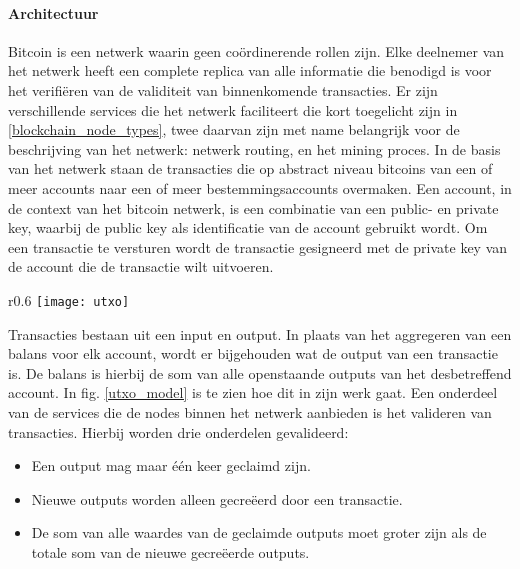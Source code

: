 \paragraph{Architectuur}
Bitcoin is een netwerk waarin geen coördinerende rollen zijn. Elke deelnemer van het netwerk heeft een complete replica van alle informatie die benodigd is voor het verifiëren van de validiteit van binnenkomende transacties. Er zijn verschillende services die het netwerk faciliteert die kort toegelicht zijn in \ref{blockchain_node_types}, twee daarvan zijn met name belangrijk voor de beschrijving van het netwerk: netwerk routing, en het mining proces. In de basis van het netwerk staan de transacties die op abstract niveau bitcoins van een of meer accounts naar een of meer bestemmingsaccounts overmaken. Een \gls{account}, in de context van het bitcoin netwerk, is een combinatie van een public- en private key, waarbij de public key als identificatie van de \gls{account} gebruikt wordt. Om een transactie te versturen wordt de transactie gesigneerd met de private key van de \gls{account} die de transactie wilt uitvoeren. 
\begin{wrapfigure}{r}{0.6\textwidth}
  \texttt{[image: utxo]}
  \caption[UTXO-model]{Voorbeeld van het UTXO-model zoals in gebruik bij Bitcoin, bron: http://news.8btc.com/thoughts-on-bytom-design-extension-of-utxo-structure.}
  \label{utxo_model}
\end{wrapfigure}

Transacties bestaan uit een input en output. In plaats van het aggregeren van een balans voor elk \gls{account}, wordt er bijgehouden wat de output van een transactie is. De balans is hierbij de som van alle openstaande outputs van het desbetreffend \gls{account}. In fig. \ref{utxo_model} is te zien hoe dit in zijn werk gaat. Een onderdeel van de services die de \glspl{node} binnen het netwerk aanbieden is het valideren van transacties. Hierbij worden drie onderdelen gevalideerd:

\begin{itemize}

  \item Een output mag maar één keer geclaimd zijn.
  \item Nieuwe outputs worden alleen gecreëerd door een transactie.
  \item De som van alle waardes van de geclaimde outputs moet groter zijn als de totale som van de nieuwe gecreëerde outputs.
\end{itemize}

